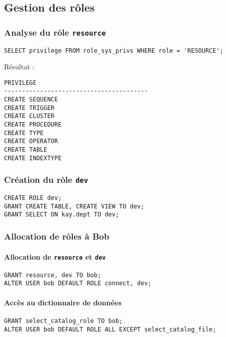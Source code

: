 \subsection{Gestion des rôles}

\subsubsection{Analyse du rôle \texttt{resource}}

\begin{verbatim}
SELECT privilege FROM role_sys_privs WHERE role = 'RESOURCE';
\end{verbatim}

Résultat :
\begin{verbatim}
PRIVILEGE                                                                       
----------------------------------------                                        
CREATE SEQUENCE                                                                 
CREATE TRIGGER                                                                  
CREATE CLUSTER                                                                  
CREATE PROCEDURE                                                                
CREATE TYPE                                                                     
CREATE OPERATOR                                                                 
CREATE TABLE                                                                    
CREATE INDEXTYPE                                                                
\end{verbatim}

\subsubsection{Création du rôle \texttt{dev}}

\begin{verbatim}
CREATE ROLE dev;
GRANT CREATE TABLE, CREATE VIEW TO dev;
GRANT SELECT ON kay.dept TO dev;
\end{verbatim}

\subsubsection{Allocation de rôles à Bob}

\paragraph{Allocation de \texttt{resource} et \texttt{dev}}

\begin{verbatim}
GRANT resource, dev TO bob;
ALTER USER bob DEFAULT ROLE connect, dev;
\end{verbatim}

\paragraph{Accès au dictionnaire de données}

\begin{verbatim}
GRANT select_catalog_role TO bob;
ALTER USER bob DEFAULT ROLE ALL EXCEPT select_catalog_file;
\end{verbatim}
